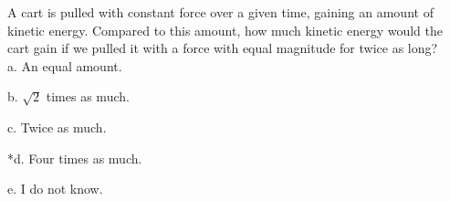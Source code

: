 
A cart is pulled with constant force over a given time, gaining an amount of kinetic energy. Compared to this amount, how much kinetic energy would the cart gain if we pulled it with a force with equal magnitude for twice as long? \\

a. An equal amount.

b. \( \sqrt{2} \) times as much.

c. Twice as much.

*d. Four times as much.

e. I do not know. \\
